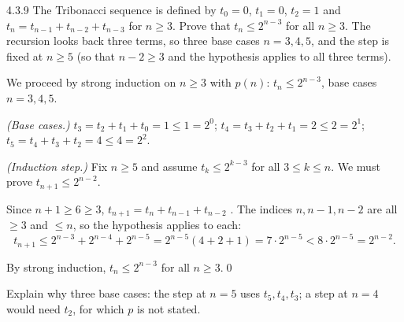 \begin{bookex}[essential]{4.3.9}
The Tribonacci sequence is defined by $t_0=0$, $t_1=0$, $t_2=1$ and $t_n=t_{n-1}+t_{n-2}+t_{n-3}$ for $n\ge3$. Prove that $t_n\le2^{n-3}$ for all $n\ge3$.
\solution
\given The recursion looks back three terms, so three base cases $n=3,4,5$, and the step is fixed at $n\ge5$ (so that $n-2\ge3$ and the hypothesis applies to all three terms).
\begin{steps}
\item We proceed by strong induction on $n\ge3$ with $p(n)$: $t_n\le2^{n-3}$, base cases $n=3,4,5$.
\item \emph{(Base cases.)} $t_3=t_2+t_1+t_0=1\le1=2^0$; $t_4=t_3+t_2+t_1=2\le2=2^1$; $t_5=t_4+t_3+t_2=4\le4=2^2$.
\item \emph{(Induction step.)} Fix $n\ge5$ and assume $t_k\le2^{k-3}$ for all $3\le k\le n$. We must prove $t_{n+1}\le2^{n-2}$.
\item Since $n+1\ge6\ge3$, $t_{n+1}=t_n+t_{n-1}+t_{n-2}$ . The indices $n,n-1,n-2$ are all $\ge3$  and $\le n$, so the hypothesis applies to each:
\[
t_{n+1}\le2^{n-3}+2^{n-4}+2^{n-5}=2^{n-5}(4+2+1)=7\cdot2^{n-5}<8\cdot2^{n-5}=2^{n-2}.
\]
\end{steps}
\conclusion By strong induction, $t_n\le2^{n-3}$ for all $n\ge3$.\qed
\begin{compare}
\item Explain why three base cases: the step at $n=5$ uses $t_5,t_4,t_3$; a step at $n=4$ would need $t_2$, for which $p$ is not stated.
\end{compare}
\end{bookex}

